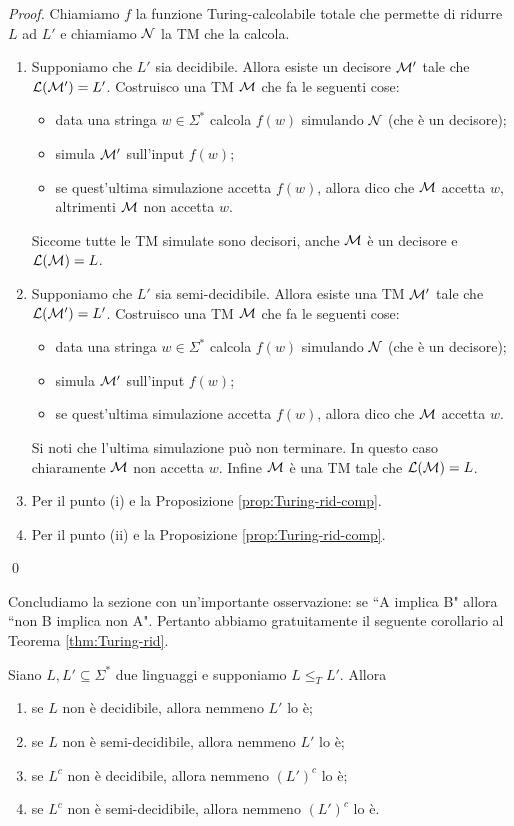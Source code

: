 \documentclass[runningheads,a4paper]{llncs}
\begin{document}
\begin{proof}
Chiamiamo $f$ la funzione Turing-calcolabile totale che permette di ridurre $L$ ad $L'$ e chiamiamo $\mathcal{N}$ la TM che la calcola.
\begin{enumerate}[label=(\roman*)]
\item Supponiamo che $L'$ sia decidibile. Allora esiste un decisore $\mathcal{M}'$ tale che $\mathcal{L}(\mathcal{M}')=L'$. Costruisco una TM $\mathcal{M}$ che fa le seguenti cose:
\begin{itemize}
\item data una stringa $w \in \Sigma^*$ calcola $f(w)$ simulando $\mathcal{N}$ (che \`{e} un decisore);
\item simula $\mathcal{M}'$ sull'input $f(w)$;
\item se quest'ultima simulazione accetta $f(w)$, allora dico che $\mathcal{M}$ accetta $w$, altrimenti $\mathcal{M}$ non accetta $w$.
\end{itemize}
Siccome tutte le TM simulate sono decisori, anche $\mathcal{M}$ \`{e} un decisore e $\mathcal{L}(\mathcal{M}) = L$.
\item Supponiamo che $L'$ sia semi-decidibile. Allora esiste una TM $\mathcal{M}'$ tale che $\mathcal{L}(\mathcal{M}')=L'$. Costruisco una TM $\mathcal{M}$ che fa le seguenti cose:
\begin{itemize}
\item data una stringa $w \in \Sigma^*$ calcola $f(w)$ simulando $\mathcal{N}$ (che \`{e} un decisore);
\item simula $\mathcal{M}'$ sull'input $f(w)$;
\item se quest'ultima simulazione accetta $f(w)$, allora dico che $\mathcal{M}$ accetta $w$.
\end{itemize}
Si noti che l'ultima simulazione pu\`{o} non terminare. In questo caso chiaramente $\mathcal{M}$ non accetta $w$. Infine $\mathcal{M}$ \`{e} una TM tale che $\mathcal{L}(\mathcal{M}) = L$.
\item Per il punto (i) e la Proposizione \ref{prop:Turing-rid-comp}.
\item Per il punto (ii) e la Proposizione \ref{prop:Turing-rid-comp}.
\end{enumerate}
\qed\end{proof}

Concludiamo la sezione con un'importante osservazione: se ``A implica B" allora ``non B implica non A". Pertanto abbiamo gratuitamente il seguente corollario al Teorema \ref{thm:Turing-rid}.

\begin{corollary}\label{cor:Turing-rid}
Siano $L,L' \subseteq \Sigma^*$ due linguaggi e supponiamo $L \leq_T L'$. Allora
\begin{enumerate}[label=(\roman*)]
\item se $L$ non \`{e} decidibile, allora nemmeno $L'$ lo \`{e};
\item se $L$ non \`{e} semi-decidibile, allora nemmeno $L'$ lo \`{e};
\item se $L^c$ non \`{e} decidibile, allora nemmeno $(L')^c$ lo \`{e};
\item se $L^c$ non \`{e} semi-decidibile, allora nemmeno $(L')^c$ lo \`{e}.
\end{enumerate}
\end{corollary}
\end{document}
